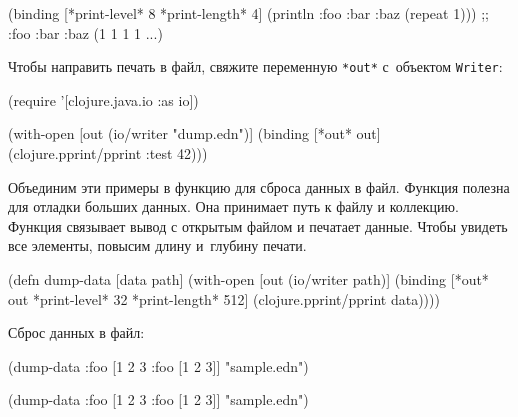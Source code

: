 \else

\begin{english}
  \begin{clojure}
(binding [*print-level* 8
          *print-length* 4]
  (println {:foo {:bar {:baz (repeat 1)}}}))
;; {:foo {:bar {:baz (1 1 1 1 ...)}}}
  \end{clojure}
\end{english}

\fi


Чтобы направить печать в файл, свяжите переменную \verb|*out*| с~объектом
\verb|Writer|:

\begin{english}
  \begin{clojure}
(require '[clojure.java.io :as io])

(with-open [out (io/writer "dump.edn")]
  (binding [*out* out]
    (clojure.pprint/pprint {:test 42})))
  \end{clojure}
\end{english}

Объединим эти примеры в функцию для сброса данных в файл. Функция полезна для
отладки больших данных. Она принимает путь к файлу и коллекцию. Функция
связывает вывод с открытым файлом и печатает данные. Чтобы увидеть все элементы,
повысим длину и~глубину печати.

\begin{english}
  \begin{clojure}
(defn dump-data
  [data path]
  (with-open [out (io/writer path)]
    (binding [*out* out
              *print-level* 32
              *print-length* 512]
      (clojure.pprint/pprint data))))
  \end{clojure}
\end{english}

\noindent
Сброс данных в файл:

\ifnarrow

\begin{english}
  \begin{clojure}
(dump-data
  {:foo [1 2 3 {:foo [1 2 3]}]}
  "sample.edn")
  \end{clojure}
\end{english}

\else

\begin{english}
  \begin{clojure}
(dump-data {:foo [1 2 3 {:foo [1 2 3]}]} "sample.edn")
  \end{clojure}
\end{english}

